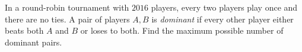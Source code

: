 In a round-robin tournament with $2016$ players, every two players play once and there are no ties. A pair of players $A,B$ is \emph{dominant} if every other player either beats both $A$ and $B$ or loses to both. Find the maximum possible number of dominant pairs.

